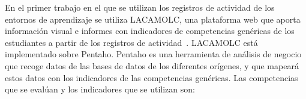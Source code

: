 
En el primer trabajo en el que se utilizan los registros de actividad de los entornos de aprendizaje se utiliza LACAMOLC, una plataforma web que aporta información visual e informes con indicadores de competencias genéricas de los estudiantes a partir de los registros de actividad~\cite{rayon2014web}. LACAMOLC está implementado sobre Pentaho. Pentaho es una herramienta de análisis de negocio que recoge datos de las bases de datos de los diferentes orígenes, y que mapeará estos datos con los indicadores de las competencias genéricas. Las competencias que se evalúan y los indicadores que se utilizan son:


